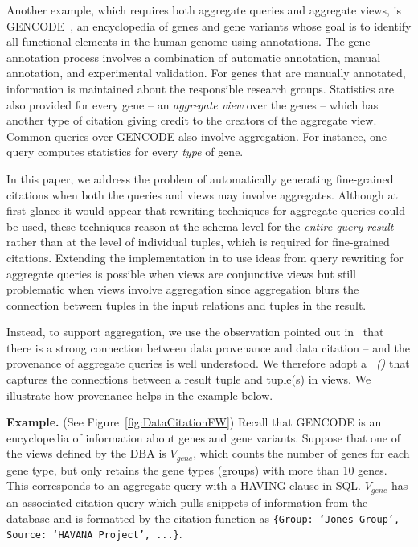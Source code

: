 Another example, which requires both aggregate queries and aggregate views, is GENCODE~\cite{harrow2012gencode}, an encyclopedia of genes and gene variants whose goal is to identify all functional elements in the human genome using annotations. The gene annotation process involves a combination of automatic annotation, manual annotation, and experimental validation. For genes that are manually annotated, information is maintained about the responsible research groups. Statistics are also provided for every gene -- an {\em aggregate view} over the genes -- which has another type of citation giving credit to the creators of the aggregate view.
Common queries over GENCODE also involve aggregation. For instance, one query computes statistics for every \textit{type} of gene.

In this paper, we address the problem of automatically generating fine-grained citations when both the queries and views may involve aggregates.    Although at first glance it would appear that rewriting techniques for aggregate queries \cite{zaharioudakis2000answering, srivastava1996answering, galindo2001orthogonal,cohen2006rewriting,cohen2006user} could be used, these techniques reason at the schema level for the \textit{entire query result} rather than at the level of individual tuples, which is required for fine-grained citations.  
Extending the implementation in \cite{wu2018data} to use ideas from query rewriting for aggregate queries is possible when views are conjunctive views but still problematic when views involve aggregation since aggregation blurs the connection between tuples in the input relations and tuples in the result.  

Instead, to support aggregation, we use the observation pointed out in~\cite{BunemanEtAl2016,alawini2018data} that there is a strong connection between data provenance and data citation -- and the provenance of aggregate queries is well understood.
We therefore adopt a \textit{\pbafull\ (\pba)} that captures the connections between a result tuple and tuple(s) in views.
We illustrate how provenance helps in the example below.

\textbf{Example.} (See Figure~\ref{fig:DataCitationFW})  Recall that GENCODE is an encyclopedia of information about genes and gene variants.  Suppose that one of the views defined by the DBA  is $V_{gene}$, which counts the number of genes for each gene type, but only retains the gene types (groups) with more than 10 genes.  This corresponds to an aggregate query with a HA\-VING-clause in SQL.  $V_{gene}$ has an associated citation query which pulls snippets of information from the database and is formatted by the citation function as 
{\tt \{Group: `Jones Group', Source: `HAVANA Project', ...\}}.


